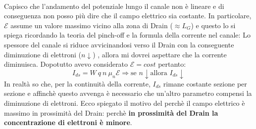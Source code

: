\\%
Capisco che l'andamento del potenziale lungo il canale non è lineare e di conseguenza non posso più dire che il campo elettrico sia costante. In particolare, 
 $\mathcal{E}$ assume un valore massimo vicino alla zona di Drain ($\approx L_G$) e questo lo si spiega ricordando la teoria del pinch-off e la formula della corrente nel canale:
Lo spessore del canale si riduce avvicinandosi verso il Drain con la conseguente diminuzione di elettroni ($n\downarrow$) , allora mi dovrei aspettare che la corrente diminuisca. Dopotutto avevo considerato $\mathcal{E}=cost$ pertanto:
%
\begin{equation}
    I_{ds}=W\ q\ n\ \mu_n \mathcal{E} \Rightarrow \text{se } n\downarrow \text{allora } I_{ds}\downarrow
\end{equation}
%
In realtà so che, per la continuità della corrente, $I_{ds}$ rimane costante sezione per sezione e affinchè questo avvenga è necessario che un'altro parametro compensi la diminuzione di elettroni. Ecco spiegato il motivo del perchè il campo elettrico è massimo in prossimità del Drain: perchè \textbf{in prossimità del Drain la concentrazione di elettroni è minore}.\\

